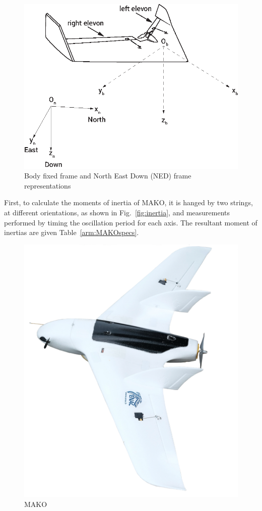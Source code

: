 \begin{figure}
\begin{center}
\includegraphics[width=13cm]{figures/ZagiElevon}    %
\caption{Body fixed frame and North East Down (NED) frame representations} 
\label{fig:bodyNEDframes}
\end{center}
\end{figure}

First, to calculate the moments of inertia of MAKO, it is hanged by two strings, at different orientations, as shown in Fig.~\ref{fig:inertia}, and measurements performed by timing the oscillation period for each axis. 
The resultant moment of inertias are given Table~\ref{arm:MAKOspecs}. 

\begin{figure}
\centering
\includegraphics[width=0.7\columnwidth]{figures/makoEmptyBack}
\caption{MAKO}
\label{figure:mako}
\end{figure}

